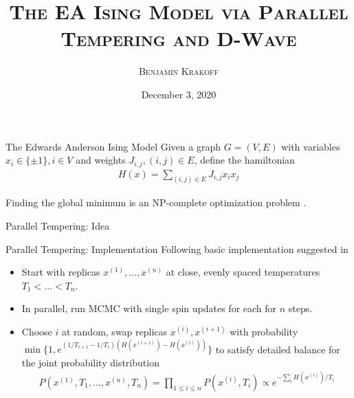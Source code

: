 \documentclass{beamer}
\title{\scshape{The EA Ising Model via Parallel Tempering and D-Wave}}
\author{\scshape{Benjamin Krakoff}}
\date{December 3, 2020}
\begin{document}
	\begin{frame}
		\titlepage
	\end{frame}

\begin{frame}{The Edwards Anderson Ising Model}
	Given a graph $G = (V, E)$ with variables $x_i \in \{\pm1\}, i \in V$ and weights $J_{i, j}, (i, j) \in E$, define the hamiltonian
	\begin{align*}
		H(x) = \sum_{(i, j) \in E} J_{i, j} x_ix_j
	\end{align*}

\vspace{30mm}
Finding the global minimum is  an NP-complete optimization problem \cite{1982JPhA...15.3241B}.
	\end{frame}

\begin{frame}{Parallel Tempering: Idea}
	
	\end{frame}

\begin{frame}{Parallel Tempering: Implementation}
	Following basic implementation suggested in \cite{B509983H}
	\begin{itemize}
	\item Start with replicas $x^{(1)}, \ldots, x^{(n)}$ at close, evenly spaced temperatures $T_1 < \ldots  < T_n$. 
	\item In parallel, run MCMC with single spin updates for each for $n$ steps. 
	\item Choose $i$ at random, swap replicas $x^{(i)}, x^{(i+1)}$ with probability  $\min\{1, e^{(1/T_{i+1}-1/{T_i})(H(x^{(i+1)}) - H(x^{(i)}))}\}$ to satisfy detailed balance for the joint probability distribution
	\begin{align*}
		P(x^{(1)}, T_1, \ldots, x^{(n)}, T_n) = \prod_{1\leq i \leq n} P(x^{(i)}, T_i) \propto e^{-\sum_i H(x^{(i)})/T_i}
		\end{align*}
	\end{itemize}
	\end{frame}
\end{document}

